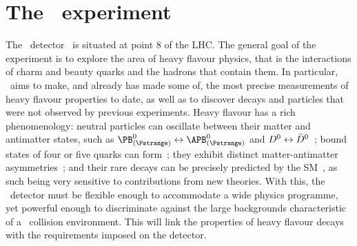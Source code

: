\chapter{The \lhcb\ experiment}
\label{chap:intro:lhcb}

The \lhcb\ detector~\cite{Alves:2008zz,Aaij:2014jba} is situated at point 8 of 
the \ac{LHC}.
The general goal of the experiment is to explore the area of heavy flavour 
physics, that is the interactions of charm and beauty quarks and the hadrons 
that contain them.
In particular, \lhcb\ aims to make, and already has made some of, the most 
precise measurements of heavy flavour properties to date, as well as to 
discover decays and particles that were not observed by previous experiments.
Heavy flavour has a rich phenomenology: neutral particles can oscillate between 
their matter and antimatter states, such as $\PBds \leftrightarrow \APBds$ and 
$D^{0} \leftrightarrow \bar{D}^{0}$~\cite{Abulencia:2006ze,Aaij:2012nva}; bound 
states of four or five quarks can form~\cite{Aaij:2014jqa,Aaij:2015tga}; they 
exhibit distinct matter-antimatter 
asymmetries~\cite{Aubert:2001nu,Abe:2001xe,Aaij:2012kz,Aaij:2013iua,Aaij:2016cla}; 
and their rare decays can be precisely predicted by the 
\ac{SM}~\cite{CMS:2014xfa,Aaij:2015oid}, as such being very sensitive to 
contributions from new theories.
With this, the \lhcb\ detector must be flexible enough to accommodate a wide 
physics programme, yet powerful enough to discriminate against the large 
backgrounds characteristic of a \pp\ collision environment.
This  will link the properties of heavy flavour 
decays with the requirements imposed on the detector.

